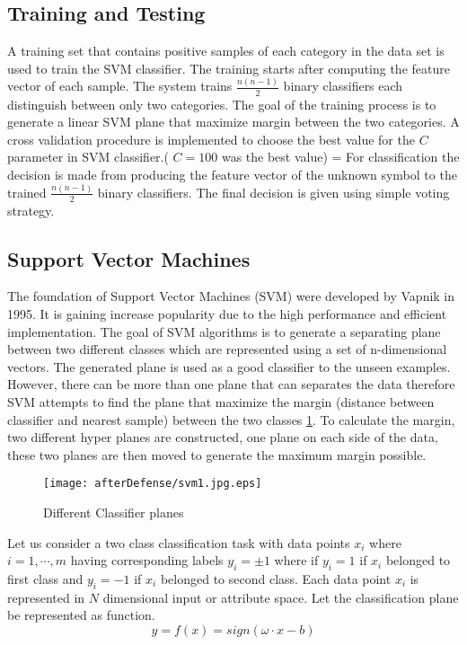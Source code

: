 \subsection {Training and Testing}
A training set that contains positive samples of each category in the data set is used to train the SVM classifier.  The training starts after computing the feature vector of each sample. The system trains $ \frac{n(n-1)}{{2}}$ binary classifiers each distinguish between only two categories. The goal of the training process is to generate a linear SVM plane that maximize margin between the two categories.  A cross validation procedure is implemented to choose the best value for the $C$ parameter in SVM classifier.( $C=100$ was the best value) 
=
For classification the decision is made from producing the feature vector of the unknown symbol to the trained $\frac{n(n-1)}{{2}}$ binary classifiers. The final decision is given using simple voting strategy. 



\subsection{Support Vector Machines}
\label{Sec:SVMdetail}
The foundation of Support Vector Machines (SVM) were developed by Vapnik \cite{svmintroduce} in 1995. It is gaining increase popularity due to the high performance and efficient implementation. The goal of SVM algorithms is to generate a separating plane between two different classes which are represented using a set of n-dimensional vectors. The generated plane is used as a good classifier to the unseen examples. However, there can be more than one plane that can separates the data therefore SVM attempts to find the plane that maximize the margin (distance between classifier and nearest sample) between the two classes \ref{fig:svm1}. To calculate the margin, two different hyper planes are constructed, one plane on each side of the data, these two planes are then moved to generate the maximum margin possible.  
\begin{figure}
	\centering
		\texttt{[image: afterDefense/svm1.jpg.eps]}
	\caption{Different Classifier planes }
	\label{fig:svm1}
\end{figure}


Let us consider a two class classification task with data points $x_i$ where $i=1,\cdots,m$ having corresponding labels $y_i=\pm1$ where if  $y_i=1$ if $x_i$ belonged to first class and $y_i=-1$ if $x_i$ belonged to second class. Each data point $x_i$ is represented in $N$ dimensional input or attribute space. Let the classification plane be represented as function. 
\begin{equation}
 y=f(x)=sign(\omega \cdot x - b)
\label{eq:planeEq}
\end{equation}


